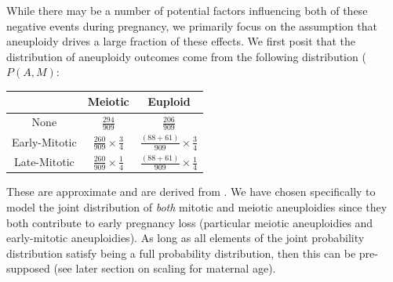 \documentclass{article}
\begin{document}
While there may be a number of potential factors influencing both of these negative events during pregnancy, we primarily focus on the assumption that aneuploidy drives a large fraction of these effects. We first posit that the distribution of aneuploidy outcomes come from the following distribution ($P(A,M)$: 


\begin{center}
\begin{tabular}{ |c|c|c| } 
 \hline
  & Meiotic & Euploid  \\ 
 \hline
 None & $\frac{294}{909}$ & $\frac{206}{909}$ \\ 
 \hline
 Early-Mitotic & $\frac{260}{909}\times \frac{3}{4}$ & $\frac{(88 + 61)}{909}\times \frac{3}{4}$ \\
 \hline
 Late-Mitotic & $\frac{260}{909}\times \frac{1}{4}$ & $\frac{(88 + 61)}{909}\times \frac{1}{4}$\\
 \hline
\end{tabular}
\end{center}

These are approximate and are derived from \citep{McCoy2023-dg}. We have chosen specifically to model the joint distribution of \textit{both} mitotic and meiotic aneuploidies since they both contribute to early pregnancy loss (particular meiotic aneuploidies and early-mitotic aneuploidies). As long as all elements of the joint probability distribution satisfy being a full probability distribution, then this can be pre-supposed (see later section on scaling for maternal age). 
\end{document}
